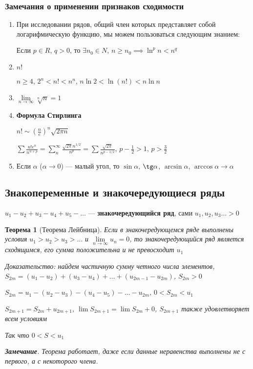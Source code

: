 \documentclass{article}
\newtheorem{theorem}{Теорема}
\begin{document}
\subsubsection{Замечания о применении признаков сходимости}

\begin{enumerate}

\item При исследовании рядов, общий член которых представляет собой логарифмическую функцию, мы можем пользоваться следующим знанием:

Если $p \in R$, $q > 0$, то $\exists n_0 \in N$, $n \ge n_0 \implies \ln^{p} n < n^{q}$

\item $n!$

$n \ge 4$, $2^{n} < n! < n^{n}$, $n \ln 2 < \ln(n!) < n \ln n$


\item $\lim\limits_{n \to \infty} \sqrt[n]{n} = 1$

\item \textbf{Формула Стирлинга}

$n! \sim (\frac{n}{e})^{n} \sqrt{2 \pi n}$

$\sum \frac{n! e^{n}}{n^{n + p}} = \sum\limits_{n}^{\infty} \frac{\sqrt{2 \pi} n^{1/2}}{n^{p}} = \sum \frac{\sqrt{2\pi}}{n^{p - 1/2}}$, $p - \frac{1}{2} > 1$, $p > \frac{3}{2}$

\item Если $\alpha$ ($\alpha \to 0$) — малый угол, то $\sin \alpha$, $\tg \alpha$, $\arcsin \alpha$, $\arccos \alpha \to \alpha$

\end{enumerate}

\subsection{Знакопеременные и знакочередующиеся ряды}

$u_1 - u_2 + u_3 - u_4 + u_5 - \dots$ — \textbf{знакочередующийся ряд}, сами $u_1, u_2, u_3 \dots > 0$

\begin{theorem}[Теорема Лейбница]

Если в знакочередующемся ряде выполнены условия $u_1 > u_2 > u_3 > \dots$ и $\lim\limits_{n \to \infty} u_n = 0$, то знакочередующийся ряд является сходящимся, его сумма положительна и не превосходит $u_1$

Доказательство: найдем частичную сумму четного числа элементов, $S_{2 m} = (u_1 - u_2) + (u_3 - u_4) + \dots + (u_{2 m - 1} - u_{2 m })$, $S_{2 m} > 0$

$S_{2 m} = u_1 - (u_2 - u_3) - (u_4 - u_5) - \dots - u_{2 m}$, $0 < S_{2 m} < u_1$

$S_{2 m + 1} = S_{2 m} + u_{2 m + 1}$, $\lim S_{2 m + 1} = \lim S_{2  m} + 0$, $S_{2 m + 1}$ также удовлетворяет всем условиям

Так что $0 < S < u_1$

\hfill

\textbf{Замечание}. Теорема работает, даже если данные неравенства выполнены не с первого, а с некоторого члена.

\end{theorem}
\end{document}
